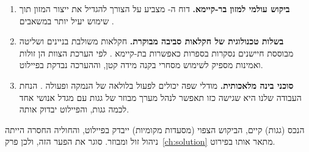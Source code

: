 \begin{enumerate}
  \item \textbf{ביקוש עולמי למזון בר-קיימא.} דוח ה- מצביע על הצורך להגדיל את ייצור המזון תוך שימוש יעיל יותר במשאבים \cite{fao2017}.
  \item \textbf{בשלות טכנולוגית של חקלאות סביבה מבוקרת.} חקלאות משולבת בניינים ושליטה מבוססת חיישנים נסקרות בספרות כאפשרות בת-קיימא \cite{specht2014}. לפי הערכת הצוות הן זולות ואמינות מספיק לשימוש מסחרי בקנה מידה קטן, וההערכה נבדקת בפיילוט.
  \item \textbf{סוכני בינה מלאכותית.} מודלי שפה יכולים לפעול בלולאה של הנמקה ופעולה \cite{yao2023}. הנחת העבודה שלנו היא שגישה כזו תאפשר לנהל מערך מבוזר של גגות עם מגדל אנושי אחד לכמה גגות, והפיילוט יבדוק אותה.
\end{enumerate}

\begin{insightbox}
הנכס (גגות) קיים, הביקוש הצפוי (מסעדות מקומיות) ייבדק בפיילוט, והחוליה החסרה הייתה ניהול זול ומבוזר.  סוגר את הפער הזה, ולכן פרק~\ref{ch:solution} מתאר אותו בפירוט.
\end{insightbox}
